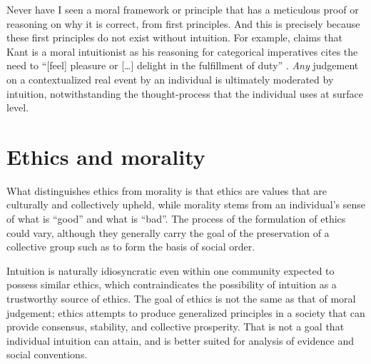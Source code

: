 \documentclass{scrartcl}
\begin{document}
Never have I seen a moral framework or principle that has a meticulous proof or reasoning on why it is correct, from first principles. And this is precisely because these first principles do not exist without intuition. For example, \textcite[2]{kant-intuition} claims that Kant is a moral intuitionist as his reasoning for categorical imperatives cites the need to ``[feel] pleasure or [\dots] delight in the fulfillment of duty'' \autocite{gmm}. \emph{Any} judgement on a contextualized real event by an individual is ultimately moderated by intuition, notwithstanding the thought-process that the individual uses at surface level.





\section{Ethics and morality}

What distinguishes ethics from morality is that ethics are values that are culturally and collectively upheld, while morality stems from an individual's sense of what is ``good'' and what is ``bad''. The process of the formulation of ethics could vary, although they generally carry the goal of the preservation of a collective group such as to form the basis of social order.

Intuition is naturally idiosyncratic even within one community expected to possess similar ethics, which contraindicates the possibility of intuition as a trustworthy source of ethics. The goal of ethics is not the same as that of moral judgement; ethics attempts to produce generalized principles in a society that can provide consensus, stability, and collective prosperity. That is not a goal that individual intuition can attain, and is better suited for analysis of evidence and social conventions.
\end{document}
